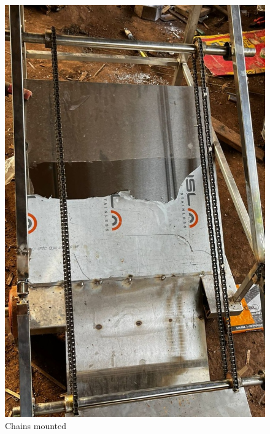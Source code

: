 \begin{figure}[H]
  \centering
    \begin{minipage}{0.30\textwidth}
    \centering
      \includegraphics[width=1\textwidth]{chain frame ass.jpg}
       \caption{Chains mounted}
    \label{Chains mounted}
    \end{minipage}
\hfill
    \begin{minipage}{0.35\textwidth}
    \centering

\end{minipage}
\end{figure}
